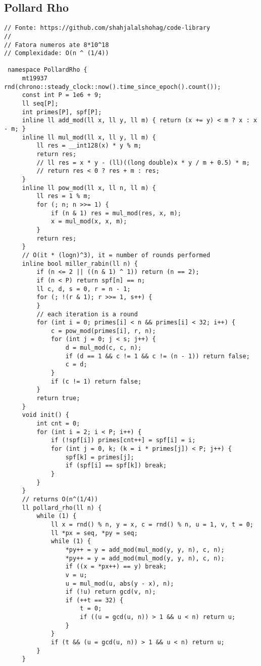 \documentclass[11pt, a4paper, twoside]{article}
\begin{document}
\subsection{Pollard Rho}
\begin{lstlisting}
// Fonte: https://github.com/shahjalalshohag/code-library
//
// Fatora numeros ate 8*10^18
// Complexidade: O(n ^ (1/4))

 namespace PollardRho {
     mt19937 rnd(chrono::steady_clock::now().time_since_epoch().count());
     const int P = 1e6 + 9;
     ll seq[P];
     int primes[P], spf[P];
     inline ll add_mod(ll x, ll y, ll m) { return (x += y) < m ? x : x - m; }
     inline ll mul_mod(ll x, ll y, ll m) {
         ll res = __int128(x) * y % m;
         return res;
         // ll res = x * y - (ll)((long double)x * y / m + 0.5) * m;
         // return res < 0 ? res + m : res;
     }
     inline ll pow_mod(ll x, ll n, ll m) {
         ll res = 1 % m;
         for (; n; n >>= 1) {
             if (n & 1) res = mul_mod(res, x, m);
             x = mul_mod(x, x, m);
         }
         return res;
     }
     // O(it * (logn)^3), it = number of rounds performed
     inline bool miller_rabin(ll n) {
         if (n <= 2 || ((n & 1) ^ 1)) return (n == 2);
         if (n < P) return spf[n] == n;
         ll c, d, s = 0, r = n - 1;
         for (; !(r & 1); r >>= 1, s++) {
         }
         // each iteration is a round
         for (int i = 0; primes[i] < n && primes[i] < 32; i++) {
             c = pow_mod(primes[i], r, n);
             for (int j = 0; j < s; j++) {
                 d = mul_mod(c, c, n);
                 if (d == 1 && c != 1 && c != (n - 1)) return false;
                 c = d;
             }
             if (c != 1) return false;
         }
         return true;
     }
     void init() {
         int cnt = 0;
         for (int i = 2; i < P; i++) {
             if (!spf[i]) primes[cnt++] = spf[i] = i;
             for (int j = 0, k; (k = i * primes[j]) < P; j++) {
                 spf[k] = primes[j];
                 if (spf[i] == spf[k]) break;
             }
         }
     }
     // returns O(n^(1/4))
     ll pollard_rho(ll n) {
         while (1) {
             ll x = rnd() % n, y = x, c = rnd() % n, u = 1, v, t = 0;
             ll *px = seq, *py = seq;
             while (1) {
                 *py++ = y = add_mod(mul_mod(y, y, n), c, n);
                 *py++ = y = add_mod(mul_mod(y, y, n), c, n);
                 if ((x = *px++) == y) break;
                 v = u;
                 u = mul_mod(u, abs(y - x), n);
                 if (!u) return gcd(v, n);
                 if (++t == 32) {
                     t = 0;
                     if ((u = gcd(u, n)) > 1 && u < n) return u;
                 }
             }
             if (t && (u = gcd(u, n)) > 1 && u < n) return u;
         }
     }
 

\end{lstlisting}
\end{document}
